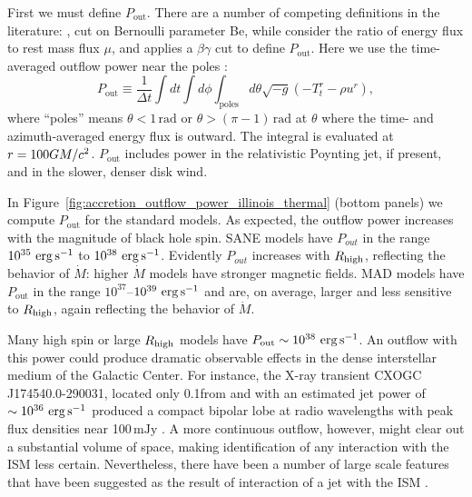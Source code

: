 First we must define $P_\mathrm{out}$.  There are a number of competing definitions in the literature: \citet{refId0}, \citet{2014A&A...570A...7M} cut on  Bernoulli parameter Be, while \citet{10.1111/j.1365-2966.2012.22002.x} consider the ratio of energy flux to rest mass flux $\mu$, and  applies a $\beta\gamma$ cut to define $P_\mathrm{out}$.  Here we use the time-averaged outflow power near the poles :
\begin{equation}
  P_\mathrm{out} \equiv \frac{1}{\Delta t}\int dt \int d\phi \int_\mathrm{poles} d\theta \sqrt{-g}\left(-T^{r}_{t}-\rho u^{r}\right),
\end{equation}
where ``poles'' means $\theta < 1\,\mathrm{rad}$ or $\theta > (\pi-1)\,\mathrm{rad}$ at $\theta$ where the time- and azimuth-averaged energy flux is outward.  The integral is evaluated at $r = 100GM/c^2$. $P_\mathrm{out}$ includes power in the relativistic Poynting jet, if present, and in the slower, denser disk wind.

In Figure~\ref{fig:accretion_outflow_power_illinois_thermal}
(bottom panels) we compute $P_\mathrm{out}$ for the standard models. As expected, the outflow power increases with the magnitude of black hole spin. SANE models have $P_{out}$ in the range ~$10^{35} \,\,\mathrm{erg}\,\mathrm{s}^{-1}$ to $10^{38} \,\,\mathrm{erg}\,\mathrm{s}^{-1}$. Evidently $P_{out}$ increases with $R_\mathrm{high}$,  reflecting the behavior of $\dot{M}$: higher $\dot{M}$ models have stronger magnetic fields. MAD models have $P_\mathrm{out}$ in the range $10^{37}$--$10^{39} \,\,\mathrm{erg}\,\mathrm{s}^{-1}$ and are, on average, larger and less sensitive to $R_\mathrm{high}$, again reflecting the behavior of $\dot{M}$.

Many high spin or large $R_\mathrm{high}$ models have $P_\mathrm{out} \sim 10^{38} \,\,\mathrm{erg}\,\mathrm{s}^{-1}$.
An outflow with this power could produce dramatic observable effects in the dense interstellar medium of the Galactic Center.  For instance, the X-ray transient CXOGC J174540.0-290031, located only 0.1\pc from \sgra and with an estimated jet power of $\sim 10^{36}\,\,\mathrm{erg}\,\mathrm{s}^{-1}$ produced a compact bipolar lobe at radio wavelengths with peak flux densities near 100$\,\mathrm{mJy}$ \citep{2005ApJ...633..218B}.  A more continuous  outflow, however, might clear out a substantial volume of space, making identification of any interaction with the ISM less certain.  Nevertheless, there have been a number of large scale features that have been suggested as the result of interaction of a jet with the ISM \citep[e.g.,][]{2013ApJ...779..154L,2021ApJ...922..254C}.





